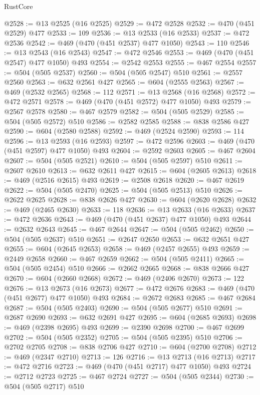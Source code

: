 \begin{lexlean}{RustCore}
\begin{coremodule}
@2528 := @13 @2525 (@16 @2525)
@2529 := @472 @2528
@2532 := @470 (@451 @2529) @477
@2533 := 109
@2536 := @13 @2533 (@16 @2533)
@2537 := @472 @2536
@2542 := @469 (@470 (@451 @2537) @477 @1050)
@2543 := 110
@2546 := @13 @2543 (@16 @2543)
@2547 := @472 @2546
@2553 := @469 (@470 (@451 @2547) @477 @1050) @493
@2554 := @2542 @2553
@2555 := @467 @2554
@2557 := @504 (@505 @2537)
@2560 := @504 (@505 @2547) @510
@2561 := @2557 @2560
@2563 := @632 @2561 @427
@2565 := @604 (@2555 @2563)
@2567 := @469 (@2532 @2565)
@2568 := 112
@2571 := @13 @2568 (@16 @2568)
@2572 := @472 @2571
@2578 := @469 (@470 (@451 @2572) @477 @1050) @493
@2579 := @2567 @2578
@2580 := @467 @2579
@2582 := @504 (@505 @2529)
@2585 := @504 (@505 @2572) @510
@2586 := @2582 @2585
@2588 := @838 @2586 @427
@2590 := @604 (@2580 @2588)
@2592 := @469 (@2524 @2590)
@2593 := 114
@2596 := @13 @2593 (@16 @2593)
@2597 := @472 @2596
@2603 := @469 (@470 (@451 @2597) @477 @1050) @493
@2604 := @2592 @2603
@2605 := @467 @2604
@2607 := @504 (@505 @2521)
@2610 := @504 (@505 @2597) @510
@2611 := @2607 @2610
@2613 := @632 @2611 @427
@2615 := @604 (@2605 @2613)
@2618 := @469 (@2516 @2615) @493
@2619 := @2508 @2618
@2620 := @467 @2619
@2622 := @504 (@505 @2470)
@2625 := @504 (@505 @2513) @510
@2626 := @2622 @2625
@2628 := @838 @2626 @427
@2630 := @604 (@2620 @2628)
@2632 := @469 (@2465 @2630)
@2633 := 118
@2636 := @13 @2633 (@16 @2633)
@2637 := @472 @2636
@2643 := @469 (@470 (@451 @2637) @477 @1050) @493
@2644 := @2632 @2643
@2645 := @467 @2644
@2647 := @504 (@505 @2462)
@2650 := @504 (@505 @2637) @510
@2651 := @2647 @2650
@2653 := @632 @2651 @427
@2655 := @604 (@2645 @2653)
@2658 := @469 (@2457 @2655) @493
@2659 := @2449 @2658
@2660 := @467 @2659
@2662 := @504 (@505 @2411)
@2665 := @504 (@505 @2454) @510
@2666 := @2662 @2665
@2668 := @838 @2666 @427
@2670 := @604 (@2660 @2668)
@2672 := @469 (@2406 @2670)
@2673 := 122
@2676 := @13 @2673 (@16 @2673)
@2677 := @472 @2676
@2683 := @469 (@470 (@451 @2677) @477 @1050) @493
@2684 := @2672 @2683
@2685 := @467 @2684
@2687 := @504 (@505 @2403)
@2690 := @504 (@505 @2677) @510
@2691 := @2687 @2690
@2693 := @632 @2691 @427
@2695 := @604 (@2685 @2693)
@2698 := @469 (@2398 @2695) @493
@2699 := @2390 @2698
@2700 := @467 @2699
@2702 := @504 (@505 @2352)
@2705 := @504 (@505 @2395) @510
@2706 := @2702 @2705
@2708 := @838 @2706 @427
@2710 := @604 (@2700 @2708)
@2712 := @469 (@2347 @2710)
@2713 := 126
@2716 := @13 @2713 (@16 @2713)
@2717 := @472 @2716
@2723 := @469 (@470 (@451 @2717) @477 @1050) @493
@2724 := @2712 @2723
@2725 := @467 @2724
@2727 := @504 (@505 @2344)
@2730 := @504 (@505 @2717) @510

\end{coremodule}
\end{lexlean}

